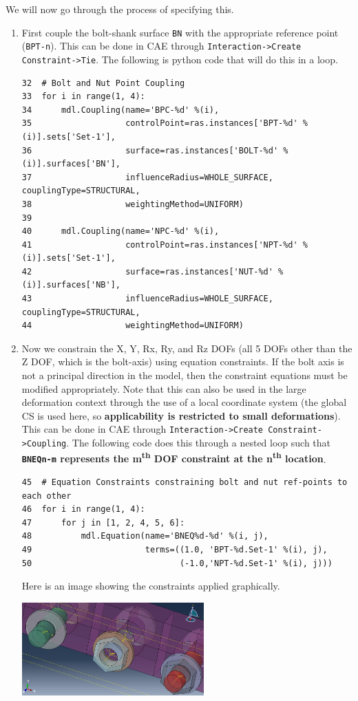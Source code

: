 \documentclass[11pt]{article}
\begin{document}
We will now go through the process of specifying this.
\begin{enumerate}
\item First couple the bolt-shank surface \texttt{BN} with the appropriate reference point (\texttt{BPT-n}).
This can be done in CAE through \texttt{Interaction->Create Constraint->Tie}.
The following is python code that will do this in a loop.
\begin{verbatim}
32  # Bolt and Nut Point Coupling
33  for i in range(1, 4):
34      mdl.Coupling(name='BPC-%d' %(i),
35                   controlPoint=ras.instances['BPT-%d' %(i)].sets['Set-1'],
36                   surface=ras.instances['BOLT-%d' %(i)].surfaces['BN'],
37                   influenceRadius=WHOLE_SURFACE, couplingType=STRUCTURAL,
38                   weightingMethod=UNIFORM)
39  
40      mdl.Coupling(name='NPC-%d' %(i),
41                   controlPoint=ras.instances['NPT-%d' %(i)].sets['Set-1'],
42                   surface=ras.instances['NUT-%d' %(i)].surfaces['NB'],
43                   influenceRadius=WHOLE_SURFACE, couplingType=STRUCTURAL,
44                   weightingMethod=UNIFORM)
\end{verbatim}
\item Now we constrain the X, Y, Rx, Ry, and Rz DOFs (all 5 DOFs other than the Z DOF, which is the bolt-axis) using equation constraints.
If the bolt axis is not a principal direction in the model, then the constraint equations must be modified appropriately.
Note that this can also be used in the large deformation context through the use of a local coordinate system (the global CS is used here, so \textbf{applicability is restricted to small deformations}).
This can be done in CAE through \texttt{Interaction->Create Constraint->Coupling}.
The following code does this through a nested loop such that \textbf{\texttt{BNEQn-m}  represents the m\textsuperscript{th} DOF constraint at the n\textsuperscript{th} location}.
\begin{verbatim}
45  # Equation Constraints constraining bolt and nut ref-points to each other
46  for i in range(1, 4):
47      for j in [1, 2, 4, 5, 6]:
48          mdl.Equation(name='BNEQ%d-%d' %(i, j),
49                       terms=((1.0, 'BPT-%d.Set-1' %(i), j),
50                              (-1.0,'NPT-%d.Set-1' %(i), j)))
\end{verbatim}
Here is an image showing the constraints applied graphically.
\begin{center}
\includegraphics[width=0.55\textwidth]{./figs/conss.png}

\end{center}
\end{enumerate}
\end{document}
